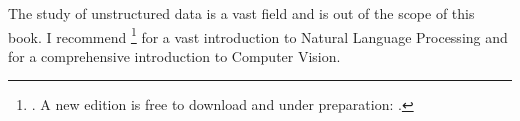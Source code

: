 The study of unstructured data is a vast field and is out of the scope of this book.  I
recommend \citeauthor{Jurafsky2008}\footnote{. A new edition is
free to download and under preparation: .} for a vast
introduction to Natural Language Processing and
\citeauthor{Szeliski2022} for a comprehensive introduction to
Computer Vision.


